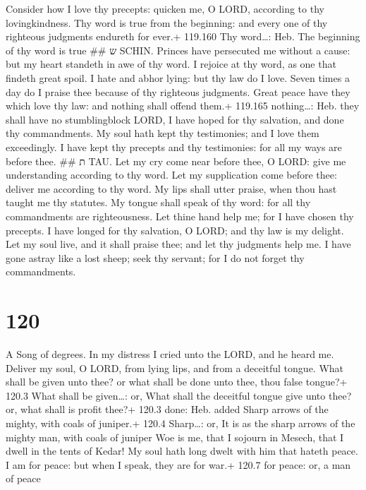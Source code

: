 Consider how I love thy precepts: quicken me, O LORD,
according to thy lovingkindness.  Thy word is true from
the beginning: and every one of thy righteous judgments endureth for
ever.+ 119.160 Thy word\ldots: Heb. The beginning of thy word is true
\#\# ש SCHIN.  Princes have persecuted me without a cause:
but my heart standeth in awe of thy word.  I rejoice at
thy word, as one that findeth great spoil.  I hate and
abhor lying: but thy law do I love.  Seven times a day do
I praise thee because of thy righteous judgments.  Great
peace have they which love thy law: and nothing shall offend them.+
119.165 nothing\ldots: Heb. they shall have no stumblingblock
 LORD, I have hoped for thy salvation, and done thy
commandments.  My soul hath kept thy testimonies; and I
love them exceedingly.  I have kept thy precepts and thy
testimonies: for all my ways are before thee. \#\# ת TAU. 
Let my cry come near before thee, O LORD: give me understanding
according to thy word.  Let my supplication come before
thee: deliver me according to thy word.  My lips shall
utter praise, when thou hast taught me thy statutes.  My
tongue shall speak of thy word: for all thy commandments are
righteousness.  Let thine hand help me; for I have chosen
thy precepts.  I have longed for thy salvation, O LORD;
and thy law is my delight.  Let my soul live, and it shall
praise thee; and let thy judgments help me.  I have gone
astray like a lost sheep; seek thy servant; for I do not forget thy
commandments.

\hypertarget{section-120}{%
\section{120}\label{section-120}}

A Song of degrees.  In my distress I cried unto the LORD,
and he heard me.  Deliver my soul, O LORD, from lying lips,
and from a deceitful tongue.  What shall be given unto thee?
or what shall be done unto thee, thou false tongue?+ 120.3 What shall be
given\ldots: or, What shall the deceitful tongue give unto thee? or,
what shall is profit thee?+ 120.3 done: Heb. added  Sharp
arrows of the mighty, with coals of juniper.+ 120.4 Sharp\ldots: or, It
is as the sharp arrows of the mighty man, with coals of juniper
 Woe is me, that I sojourn in Mesech, that I dwell in the
tents of Kedar!  My soul hath long dwelt with him that
hateth peace.  I am for peace: but when I speak, they are
for war.+ 120.7 for peace: or, a man of peace

